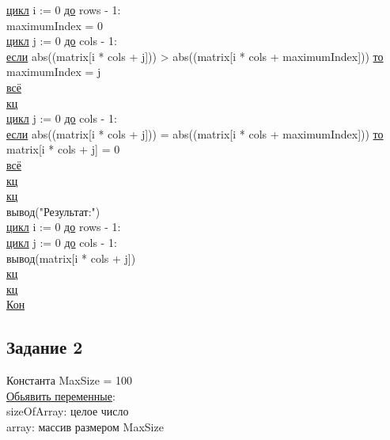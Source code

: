 \noindent
\null\qquad \underline{цикл} i := 0 \underline{до} rows - 1:\\
\null\qquad \qquad maximumIndex = 0\\
\null\qquad \qquad \underline{цикл} j := 0 \underline{до} cols - 1:\\
\null\qquad \qquad \qquad \underline{если} abs((matrix[i * cols + j])) > abs((matrix[i * cols + maximumIndex])) \underline{то}\\
\null\qquad \qquad \qquad \qquad maximumIndex = j\\
\null\qquad \qquad \qquad \underline{всё}\\
\null\qquad \qquad \underline{кц}\\
\null\qquad \qquad \underline{цикл} j := 0 \underline{до} cols - 1:\\
\null\qquad \qquad \qquad \underline{если} abs((matrix[i * cols + j])) = abs((matrix[i * cols + maximumIndex])) \underline{то}\\
\null\qquad \qquad \qquad \qquad matrix[i * cols + j] = 0\\
\null\qquad \qquad \qquad \underline{всё}\\
\null\qquad \qquad \underline{кц}\\
\null\qquad \underline{кц}\\

\noindent
\null\qquad вывод("Результат:")\\
\null\qquad \underline{цикл} i := 0 \underline{до} rows - 1:\\
\null\qquad \qquad \underline{цикл} j := 0 \underline{до} cols - 1:\\
\null\qquad \qquad \qquad вывод(matrix[i * cols + j])\\
\null\qquad \qquad \underline{кц}\\
\null\qquad \underline{кц}\\

\noindent
\noindent \underline{Кон}\\

\subsection*{Задание 2}

Константа MaxSize = 100\\

\noindent
\underline{Обьявить переменные}:\\
\null\qquad sizeOfArray: целое число\\
\null\qquad array: массив размером MaxSize\\

